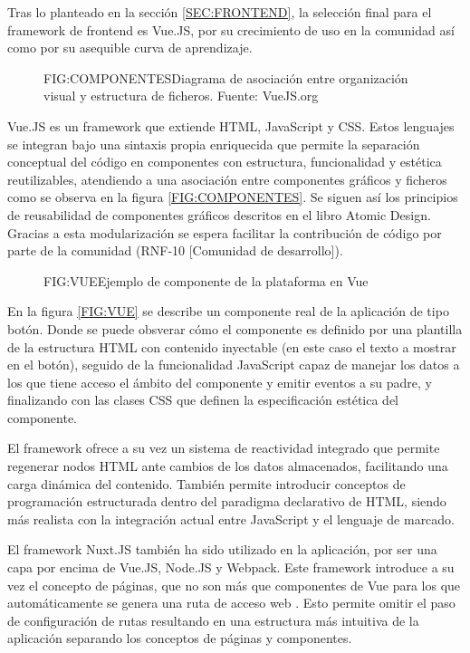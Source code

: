 
Tras lo planteado en la sección \ref{SEC:FRONTEND}, la selección final para el framework de frontend es Vue.JS, por su crecimiento de uso en la comunidad así como por su asequible curva de aprendizaje.

\begin{figure}[Division por componentes]{FIG:COMPONENTES}{Diagrama de asociación entre organización visual y estructura de ficheros. Fuente: VueJS.org}
\end{figure}

Vue.JS es un framework que extiende HTML, JavaScript y CSS\cite{VueJS}. Estos lenguajes se integran bajo una sintaxis propia enriquecida que permite la separación conceptual del código en componentes con estructura, funcionalidad y estética reutilizables, atendiendo a una asociación entre componentes gráficos y ficheros como se observa en la figura \ref{FIG:COMPONENTES}. Se siguen así los principios de reusabilidad de componentes gráficos descritos en el libro Atomic Design\cite{AtomicDesign}. Gracias a esta modularización se espera facilitar la contribución de código por parte de la comunidad (RNF-10 [Comunidad de desarrollo]).

\begin{figure}[Ejemplo de componente en Vue]{FIG:VUE}{Ejemplo de componente de la plataforma en Vue}
\end{figure}

En la figura \ref{FIG:VUE} se describe un componente real de la aplicación de tipo botón. Donde se puede obsverar cómo el componente es definido por una plantilla de la estructura HTML con contenido inyectable (en este caso el texto a mostrar en el botón), seguido de la funcionalidad JavaScript capaz de manejar los datos a los que tiene acceso el ámbito del componente y emitir eventos a su padre, y finalizando con las clases CSS que definen la especificación estética del componente. 

El framework ofrece a su vez un sistema de reactividad integrado que permite regenerar nodos HTML ante cambios de los datos almacenados, facilitando una carga dinámica del contenido. También permite introducir conceptos de programación estructurada dentro del paradigma declarativo de HTML, siendo más realista con la integración actual entre JavaScript y el lenguaje de marcado. 

El framework Nuxt.JS también ha sido utilizado en la aplicación, por ser una capa por encima de Vue.JS, Node.JS y Webpack. Este framework introduce a su vez el concepto de páginas, que no son más que componentes de Vue para los que automáticamente se genera una ruta de acceso web \cite{NuxtJS}. Esto permite omitir el paso de configuración de rutas resultando en una estructura más intuitiva de la aplicación separando los conceptos de páginas y componentes.

